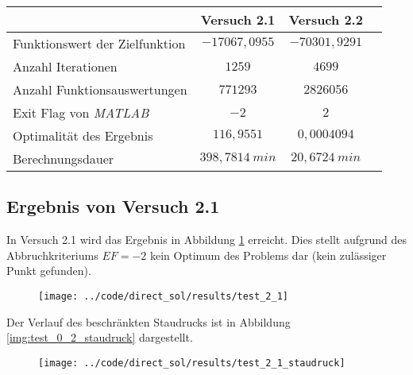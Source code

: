 \begin{table}[H]
    \centering
    \label{tab:Versuch2_TA}
    \begin{tabularx}{.9\textwidth}{Zccc}
        \toprule
         & \textbf{Versuch 2.1} & \textbf{Versuch 2.2} \\
        \midrule
        Funktionswert der Zielfunktion & $-17067,0955$ & $-70301,9291$ \\
        Anzahl Iterationen & $1259$ & $4699$ \\
        Anzahl Funktionsauswertungen & $771293$ & $2826056$ \\
        Exit Flag von \textit{MATLAB} & $-2$ & $2$ \\
        Optimalität des Ergebnis & $116,9551$ & $0,0004094$ \\
        Berechnungsdauer & $398,7814 \ min$ & $20,6724 \ min$ \\
        \bottomrule
    \end{tabularx}
\end{table}




\subsection{Ergebnis von Versuch 2.1}\label{kap:Versuch21}
In Versuch 2.1 wird das Ergebnis in Abbildung \ref{img:test_2_1} erreicht. Dies stellt aufgrund des Abbruchkriteriums $EF = -2$ kein Optimum des Problems dar (kein zulässiger Punkt gefunden).
\begin{figure}[H]
\begin{center}
\texttt{[image: ../code/direct\_sol/results/test\_2\_1]}
 \label{img:test_2_1}
\end{center}
\end{figure}
Der Verlauf des beschränkten Staudrucks ist in Abbildung \ref{img:test_0_2_staudruck} dargestellt.
\begin{figure}[H]
\begin{center}
\texttt{[image: ../code/direct\_sol/results/test\_2\_1\_staudruck]}
 \label{img:test_2_1_staudruck}
\end{center}
\end{figure}




